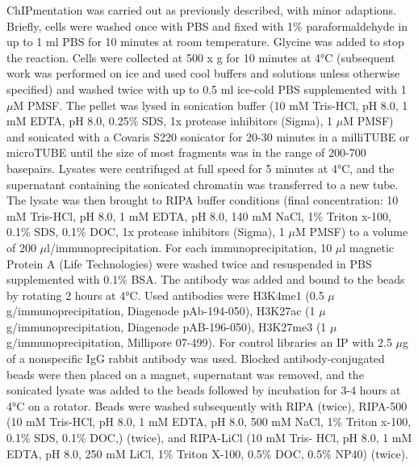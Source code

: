 \documentclass[10pt,]{article}
\begin{document}
ChIPmentation was carried out as previously
described\citep{Schmidl2015}, with minor adaptions. Briefly, cells were
washed once with PBS and fixed with 1\% paraformaldehyde in up to 1 ml
PBS for 10 minutes at room temperature. Glycine was added to stop the
reaction. Cells were collected at 500 x g for 10 minutes at 4°C
(subsequent work was performed on ice and used cool buffers and
solutions unless otherwise specified) and washed twice with up to 0.5 ml
ice-cold PBS supplemented with 1 $\mu$M PMSF. The pellet was lysed in
sonication buffer (10 mM Tris-HCl, pH 8.0, 1 mM EDTA, pH 8.0, 0.25\%
SDS, 1x protease inhibitors (Sigma), 1 $\mu$M PMSF) and sonicated with a
Covaris S220 sonicator for 20-30 minutes in a milliTUBE or microTUBE
until the size of most fragments was in the range of 200-700 basepairs.
Lysates were centrifuged at full speed for 5 minutes at 4°C, and the
supernatant containing the sonicated chromatin was transferred to a new
tube. The lysate was then brought to RIPA buffer conditions (final
concentration: 10 mM Tris-HCl, pH 8.0, 1 mM EDTA, pH 8.0, 140 mM NaCl,
1\% Triton x-100, 0.1\% SDS, 0.1\% DOC, 1x protease inhibitors (Sigma),
1 $\mu$M PMSF) to a volume of 200 $\mu$l/immunoprecipitation. For each
immunoprecipitation, 10 $\mu$l magnetic Protein A (Life Technologies)
were washed twice and resuspended in PBS supplemented with 0.1\% BSA.
The antibody was added and bound to the beads by rotating 2 hours at
4°C. Used antibodies were H3K4me1 (0.5 $\mu$g/immunoprecipitation,
Diagenode pAb-194-050), H3K27ac (1 $\mu$g/immunoprecipitation, Diagenode
pAB-196-050), H3K27me3 (1 $\mu$g/immunoprecipitation, Millipore 07-499).
For control libraries an IP with 2.5 $\mu$g of a nonspecific IgG rabbit
antibody was used. Blocked antibody-conjugated beads were then placed on
a magnet, supernatant was removed, and the sonicated lysate was added to
the beads followed by incubation for 3-4 hours at 4°C on a rotator.
Beads were washed subsequently with RIPA (twice), RIPA-500 (10 mM
Tris-HCl, pH 8.0, 1 mM EDTA, pH 8.0, 500 mM NaCl, 1\% Triton x-100,
0.1\% SDS, 0.1\% DOC,) (twice), and RIPA-LiCl (10 mM Tris- HCl, pH 8.0,
1 mM EDTA, pH 8.0, 250 mM LiCl, 1\% Triton X-100, 0.5\% DOC, 0.5\% NP40)
(twice).
\end{document}
